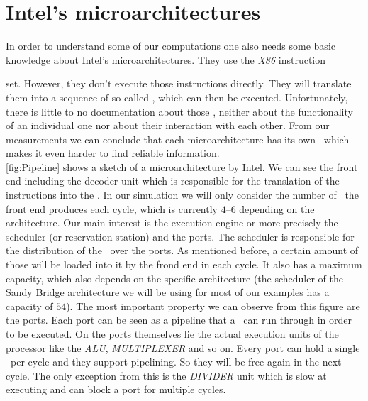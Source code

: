 \section{Intel's microarchitectures}



In order to understand some of our computations one also needs some basic knowledge about Intel's microarchitectures. They use the \emph{X86} instruction


set. However, they don't execute those instructions directly. They will translate them into a sequence of so called \microops, which can then be executed. Unfortunately, there is little to no documentation about those \microops, neither about the functionality of an individual one nor about their interaction with each other. From our measurements we can conclude that each microarchitecture has its own \microops\ which makes it even harder to find reliable information.\\ \autoref{fig:Pipeline} shows a sketch of a microarchitecture by Intel. We can see the front end including the decoder unit which is responsible for the translation of the instructions into the \microops. In our simulation we will only consider the number of \microops\ the front end produces each cycle, which is currently $4$--$6$ depending on the architecture. Our main interest is the execution engine or more precisely the scheduler (or reservation station) and the ports. The scheduler is responsible for the distribution of the \microops\ over the ports. As mentioned before, a certain amount of those will be loaded into it by the frond end in each cycle. It also has a maximum capacity, which also depends on the specific architecture (the scheduler of the Sandy Bridge architecture we will be using for most of our examples has a capacity of $54$). The most important property we can observe from this figure are the ports. Each port can be seen as a pipeline that a \microop\ can run through in order to be executed. On the ports themselves lie the actual execution units of the processor like the \emph{ALU}, \emph{MULTIPLEXER} and so on. Every port can hold a single \microop\ per cycle and they support pipelining. So they will be free again in the next cycle. The only exception from this is the \emph{DIVIDER} unit which is slow at executing and can block a port for multiple cycles.
 
 
